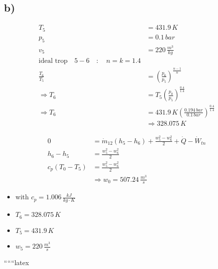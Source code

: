 

\subsection*{b)}

\begin{align*}
    T_5 &= 431.9 \, K \\
    p_5 &= 0.1 \, bar \\
    v_5 &= 220 \, \frac{m^3}{kg} \\
    \text{ideal trop} \quad 5-6 \quad : \quad n = k = 1.4 \\
    \frac{T_6}{T_5} &= \left( \frac{p_6}{p_5} \right)^{\frac{n-1}{n}} \\
    \Rightarrow T_6 &= T_5 \left( \frac{p_0}{p_5} \right)^{\frac{0.4}{1.4}} \\
    \Rightarrow T_6 &= 431.9 \, K \left( \frac{0.194 \, bar}{0.1 \, bar} \right)^{\frac{0.4}{1.4}} \\
    &\Rightarrow 328.075 \, K
\end{align*}

\begin{align*}
    0 &= \dot{m}_{12} (h_5 - h_6) + \frac{w_5^2 - w_6^2}{2} + \dot{Q} - \dot{W}_{tn} \\
    h_6 - h_5 &= \frac{w_5^2 - w_6^2}{2} \\
    c_p (T_0 - T_5) &= \frac{w_5^2 - w_6^2}{2} \\
    &\Rightarrow w_0 = 507.24 \, \frac{m^3}{s}
\end{align*}

\begin{itemize}
    \item with $c_p = 1.006 \, \frac{kJ}{kg \cdot K}$
    \item $T_6 = 328.075 \, K$
    \item $T_5 = 431.9 \, K$
    \item $w_5 = 220 \, \frac{m^3}{s}$
\end{itemize}

``````latex